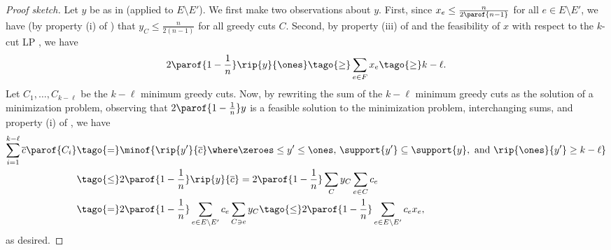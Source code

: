 \documentclass{toc}
\newcommand{\costof}[1]{c_{#1}}
\providecommand{\sumcost}{\overline{c}\parof} %
\providecommand{\sumcostv}{\overline{c}} %
\newcommand{\wrt}{with respect to\xspace} %
\begin{document}
\bigskip

\begin{proof}[Proof sketch]
  Let $y$ be as in  (applied to $E \setminus
  E'$). We first make two observations about $y$. First, since
  \begin{math}
    x_e \leq \frac{n}{2 \parof{n-1}}
  \end{math}
  for all $e \in E \setminus E'$, we have (by property (i) of
  ) that
  \begin{math}
    y_C \leq \frac{n}{2(n-1)}
  \end{math}
  for all greedy cuts $C$. Second, by \tagr property (iii) of
   and \tagr the feasibility of $x$ \wrt the
  $k$-cut LP , we have
  \begin{align*}
    2 \parof{1 - \frac{1}{n}}\rip{y}{\ones}              %
    \tago{\geq}                    %
    \sum_{e \in F} x_e          %
    \tago{\geq}                 %
    k - \ell.
  \end{align*}
  Let $C_1,\dots,C_{k-\ell}$ be the $k-\ell$ minimum greedy cuts.
  Now, by \tagr rewriting the sum of the $k-\ell$ minimum greedy cuts
  as the solution of a minimization problem, \tagr observing that
  $2 \parof{1 - \frac{1}{n}} y$ is a feasible solution to the
  minimization problem, \tagr interchanging sums, and \tagr property
  (i) of , we have
  \begin{align*}
    \sum_{i=1}^{k-\ell} \sumcost{C_i} %
    &\tago{=}                                               %
      \minof{                                           %
      \rip{y'}{\sumcostv}                              %
      \where                                          %
      \zeroes \leq y' \leq \ones
      \text{, }                       %
      \support{y'} \subseteq \support{y},               %
      \text{ and }
      \rip{\ones}{y'} \geq k - \ell
      } \\
    &\tago{\leq}                       %
      2 \parof{1 - \frac{1}{n}}\rip{y}{\sumcostv} %
      =                         %
      2 \parof{1 - \frac{1}{n}} \sum_C y_C \sum_{e \in C} \costof{e} %
    \\
    &\tago{=}
      2 \parof{1 - \frac{1}{n}} \sum_{e \in E \setminus E'} \costof{e} \sum_{C \ni e} y_C %
      \tago{\leq}                                 %
      2 \parof{1 - \frac{1}{n}} \sum_{e \in E \setminus E'} c_e x_e,
  \end{align*}
  as desired.
\end{proof}
\end{document}
